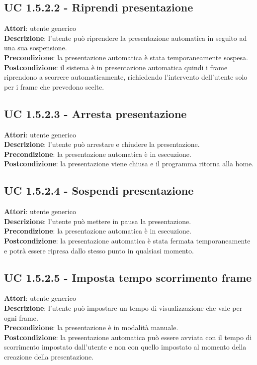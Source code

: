 	\subsection{UC 1.5.2.2 - Riprendi presentazione}{
		\label{uc1.5.2.2}
		\textbf{Attori}: utente generico \\
		\textbf{Descrizione}: l'utente può riprendere la presentazione automatica in seguito ad una sua sospensione. \\
		\textbf{Precondizione}: la presentazione automatica è stata temporaneamente sospesa.	\\
		\textbf{Postcondizione}: il sistema è in presentazione automatica quindi i frame riprendono a scorrere automaticamente, richiedendo l'intervento dell'utente solo per i frame che prevedono scelte.	\\
	}
	\subsection{UC 1.5.2.3 - Arresta presentazione}{
		\label{uc1.5.2.3}
		\textbf{Attori}: utente generico \\
		\textbf{Descrizione}: l'utente può arrestare e chiudere la presentazione. \\
		\textbf{Precondizione}: la presentazione automatica è in esecuzione.	\\
		\textbf{Postcondizione}: la presentazione viene chiusa e il programma ritorna alla home.	\\
	}
	\subsection{UC 1.5.2.4 - Sospendi presentazione}{
		\label{uc1.5.2.4}
		\textbf{Attori}: utente generico \\
		\textbf{Descrizione}: l'utente può mettere in pausa la presentazione. \\
		\textbf{Precondizione}: la presentazione automatica è in esecuzione.	\\
		\textbf{Postcondizione}: la presentazione automatica è stata fermata temporaneamente e potrà essere ripresa dallo stesso punto in qualsiasi momento.	\\
	}
	\subsection{UC 1.5.2.5 - Imposta tempo scorrimento frame}{
		\label{uc1.5.2.5}
		\textbf{Attori}: utente generico \\
		\textbf{Descrizione}: l'utente può impostare un tempo di visualizzazione che vale per ogni frame. \\
		\textbf{Precondizione}: la presentazione è in modalità manuale.	\\
		\textbf{Postcondizione}: la presentazione automatica può essere avviata con il tempo di scorrimento impostato dall'utente e non con quello impostato al momento della creazione della presentazione.	\\
	}
